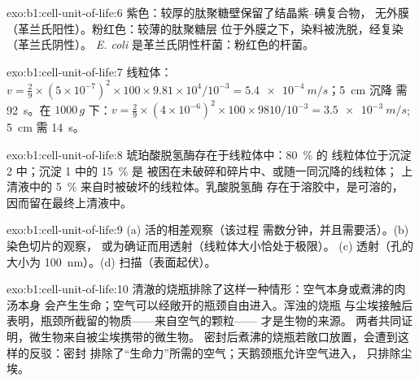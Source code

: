 \begin{solution}{exo:b1:cell-unit-of-life:6}
紫色：较厚的肽聚糖壁保留了结晶紫–碘复合物，
无外膜（革兰氏阳性）。粉红色：较薄的肽聚糖层
位于外膜之下，染料被洗脱，经复染（革兰氏阴性）。
\emph{E. coli} 是革兰氏阴性杆菌：粉红色的杆菌。
\end{solution}

\begin{solution}{exo:b1:cell-unit-of-life:7}
线粒体：$v = \frac{2}{9}\times(5\times 10^{-7})^2\times 100\times
9.81\times 10^4/10^{-3} = \qty{5.4e-4}{m/s}$；\qty{5}{cm} 沉降
需 \qty{92}{s}。在 $1000\,g$ 下：$v = \frac{2}{9}\times(4\times
10^{-6})^2\times 100\times 9810/10^{-3} = \qty{3.5e-3}{m/s}$; \qty{5}{cm}
需 \qty{14}{s}。
\end{solution}

\begin{solution}{exo:b1:cell-unit-of-life:8}
琥珀酸脱氢酶存在于线粒体中：\qty{80}{\%} 的
线粒体位于沉淀 2 中；沉淀 1 中的 \qty{15}{\%} 是
被困在未破碎和碎片中、或随一同沉降的线粒体；
上清液中的 \qty{5}{\%} 来自时被破坏的线粒体。乳酸脱氢酶
存在于溶胶中，是可溶的，
因而留在最终上清液中。
\end{solution}

\begin{solution}{exo:b1:cell-unit-of-life:9}
(a) 活的相差观察（该过程
需数分钟，并且需要活）。(b) 染色切片的观察，
或为确证而用透射（线粒体大小恰处于极限）。
(c) 透射（孔的大小为 \qty{100}{nm}）。(d) 扫描（表面起伏）。
\end{solution}

\begin{solution}{exo:b1:cell-unit-of-life:10}
清澈的烧瓶排除了这样一种情形：空气本身或煮沸的肉汤本身
会产生生命；空气可以经敞开的瓶颈自由进入。浑浊的烧瓶
与尘埃接触后表明，瓶颈所截留的物质——来自空气的颗粒——
才是生物的来源。
两者共同证明，微生物来自被尘埃携带的微生物。
密封后煮沸的烧瓶若敞口放置，会遭到这样的反驳：密封
排除了“生命力”所需的空气；天鹅颈瓶允许空气进入，
只排除尘埃。
\end{solution}

